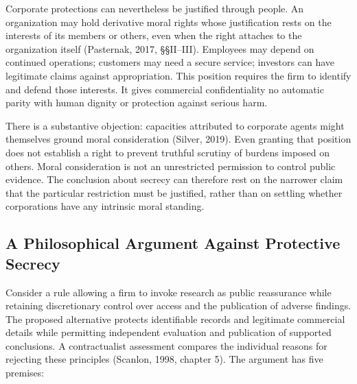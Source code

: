 Corporate protections can nevertheless be justified through people. An
organization may hold derivative moral rights whose justification rests
on the interests of its members or others, even when the right attaches
to the organization itself (Pasternak, 2017, §§II--III). Employees may
depend on continued operations; customers may need a secure service;
investors can have legitimate claims against appropriation. This
position requires the firm to identify and defend those interests. It
gives commercial confidentiality no automatic parity with human dignity
or protection against serious harm.

There is a substantive objection: capacities attributed to corporate
agents might themselves ground moral consideration (Silver, 2019). Even
granting that position does not establish a right to prevent truthful
scrutiny of burdens imposed on others. Moral consideration is not an
unrestricted permission to control public evidence. The conclusion about
secrecy can therefore rest on the narrower claim that the particular
restriction must be justified, rather than on settling whether
corporations have any intrinsic moral standing.

\hypertarget{M09-a-philosophical-argument-against-protective-secrecy}{%
\subsection{A Philosophical Argument Against Protective
Secrecy}\label{M09-a-philosophical-argument-against-protective-secrecy}}

\noindent \noindent Consider a rule allowing a firm to invoke research as public
reassurance while retaining discretionary control over access and the
publication of adverse findings. The proposed alternative protects
identifiable records and legitimate commercial details while permitting
independent evaluation and publication of supported conclusions. A
contractualist assessment compares the individual reasons for rejecting
these principles (Scanlon, 1998, chapter 5). The argument has five
premises:

